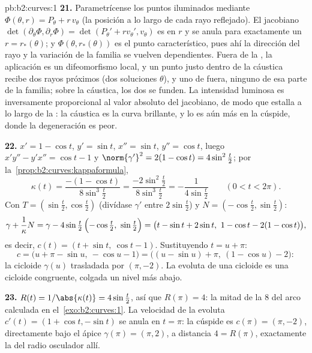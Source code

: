 \begin{solution}{pb:b2:curves:1}
\textbf{21.} Parametrícense los puntos iluminados mediante
$\Phi(\theta, r) = P_\theta + r\,v_\theta$ (la posición a lo largo de
cada rayo reflejado). El  jacobiano
$\det(\partial_\theta\Phi, \partial_r\Phi) = \det(P_\theta' +
rv_\theta', v_\theta)$ es  en $r$ y se anula para exactamente un
$r = r_*(\theta)$; y $\Phi(\theta, r_*(\theta))$ es el punto
característico, pues ahí la dirección del rayo y la variación de la
familia se vuelven dependientes. Fuera de la , la
aplicación es un difeomorfismo local, y un punto justo dentro de la
cáustica recibe dos rayos próximos (dos soluciones $\theta$), y uno
de fuera, ninguno de esa parte de la familia; sobre la cáustica, los
dos se funden. La intensidad luminosa es inversamente proporcional al
valor absoluto del jacobiano, de modo que estalla a lo largo de la
: la cáustica es la curva brillante, y lo es aún más en la
cúspide, donde la degeneración es peor.

\textbf{22.} $x' = 1 - \cos t$, $y' = \sin t$, $x'' = \sin t$, $y'' =
\cos t$, luego $x'y'' - y'x'' = \cos t - 1$ y $\norm{\gamma'}^2 = 2(1
- \cos t) = 4\sin^2\tfrac t2$; por la~\cref{prop:b2:curves:kappaformula},
\[
\kappa(t) = \frac{-(1 - \cos t)}{8\sin^3\tfrac t2}
= \frac{-2\sin^2\tfrac t2}{8\sin^3\tfrac t2}
= -\frac1{4\sin\tfrac t2}
\qquad (0 < t < 2\pi).
\]
Con $T = (\sin\tfrac t2, \cos\tfrac t2)$ (divídase $\gamma'$ entre
$2\sin\tfrac t2$) y $N = (-\cos\tfrac t2, \sin\tfrac t2)$:
\[
\gamma + \frac1\kappa N
= \gamma - 4\sin\tfrac t2\,\Bigl(-\cos\tfrac t2,\
\sin\tfrac t2\Bigr)
= \bigl(t - \sin t + 2\sin t,\ 1 - \cos t - 2(1 - \cos
t)\bigr),
\]
es decir, $c(t) = (t + \sin t,\ \cos t - 1)$. Sustituyendo $t = u +
\pi$:
\[
c = \bigl(u + \pi - \sin u,\ -\cos u - 1\bigr)
= \bigl((u - \sin u) + \pi,\ (1 - \cos u) - 2\bigr) :
\]
la cicloide $\gamma(u)$ trasladada por $(\pi, -2)$. La evoluta de una
cicloide es una cicloide congruente, colgada un nivel más abajo.

\textbf{23.} $R(t) = 1/\abs{\kappa(t)} = 4\sin\tfrac t2$, así que
$R(\pi) = 4$: la mitad de la  $8$ del arco calculada en el~\cref{exo:b2:curves:1}. La velocidad de la evoluta $c'(t) = (1 +
\cos t, -\sin t)$ se anula en $t = \pi$: la cúspide es $c(\pi) =
(\pi, -2)$, directamente bajo el ápice $\gamma(\pi) = (\pi, 2)$, a
distancia $4 = R(\pi)$, exactamente la  del radio osculador
allí.


\end{solution}

